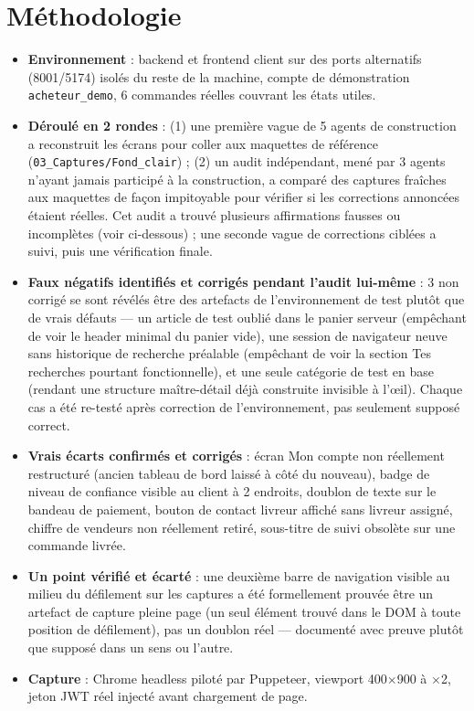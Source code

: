 \documentclass[11pt]{article}
\begin{document}
\section*{Méthodologie}
\begin{itemize}
  \item \textbf{Environnement} : backend et frontend client sur des ports alternatifs (8001/5174) isolés du reste de la machine, compte de démonstration \texttt{acheteur\_demo}, 6 commandes réelles couvrant les états utiles.
  \item \textbf{Déroulé en 2 rondes} : (1) une première vague de 5 agents de construction a reconstruit les écrans pour coller aux maquettes de référence (\texttt{03\_Captures/Fond\_clair}) ; (2) un audit indépendant, mené par 3 agents n'ayant jamais participé à la construction, a comparé des captures fraîches aux maquettes de façon \og impitoyable\fg{} pour vérifier si les corrections annoncées étaient réelles. Cet audit a trouvé plusieurs affirmations fausses ou incomplètes (voir ci-dessous) ; une seconde vague de corrections ciblées a suivi, puis une vérification finale.
  \item \textbf{Faux négatifs identifiés et corrigés pendant l'audit lui-même} : 3 \og non corrigé\fg{} se sont révélés être des artefacts de l'environnement de test plutôt que de vrais défauts — un article de test oublié dans le panier serveur (empêchant de voir le header minimal du panier vide), une session de navigateur neuve sans historique de recherche préalable (empêchant de voir la section \og Tes recherches\fg{} pourtant fonctionnelle), et une seule catégorie de test en base (rendant une structure maître-détail déjà construite invisible à l'œil). Chaque cas a été re-testé après correction de l'environnement, pas seulement supposé correct.
  \item \textbf{Vrais écarts confirmés et corrigés} : écran \og Mon compte\fg{} non réellement restructuré (ancien tableau de bord laissé à côté du nouveau), badge de niveau de confiance visible au client à 2 endroits, doublon de texte sur le bandeau de paiement, bouton de contact livreur affiché sans livreur assigné, chiffre de vendeurs non réellement retiré, sous-titre de suivi obsolète sur une commande livrée.
  \item \textbf{Un point vérifié et écarté} : une \og deuxième barre de navigation\fg{} visible au milieu du défilement sur les captures a été formellement prouvée être un artefact de capture \og pleine page\fg{} (un seul élément trouvé dans le DOM à toute position de défilement), pas un doublon réel — documenté avec preuve plutôt que supposé dans un sens ou l'autre.
  \item \textbf{Capture} : Chrome headless piloté par Puppeteer, viewport 400$\times$900 à $\times$2, jeton JWT réel injecté avant chargement de page.
\end{itemize}
\newpage
\end{document}
